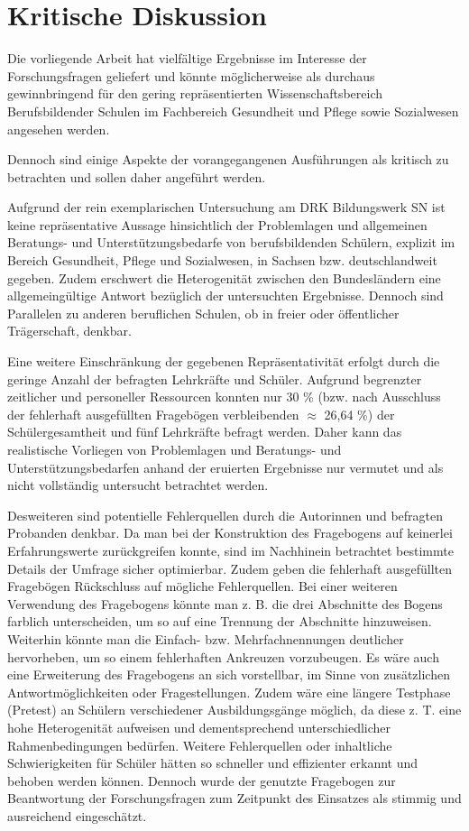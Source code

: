 \section{Kritische Diskussion}
\label{sec:KritischeDiskussion}

Die vorliegende Arbeit hat vielfältige Ergebnisse im Interesse der Forschungsfragen geliefert und könnte möglicherweise als durchaus gewinnbringend für den gering repräsentierten Wissenschaftsbereich Berufsbildender Schulen im Fachbereich Gesundheit und Pflege sowie Sozialwesen angesehen werden.

Dennoch sind einige Aspekte der vorangegangenen Ausführungen als kritisch zu betrachten und sollen daher angeführt werden.

Aufgrund der rein exemplarischen Untersuchung am DRK Bildungswerk SN ist keine repräsentative Aussage hinsichtlich der Problemlagen und allgemeinen Beratungs- und Unterstützungsbedarfe von berufsbildenden Schülern, explizit im Bereich Gesundheit, Pflege und Sozialwesen, in Sachsen bzw. deutschlandweit gegeben. Zudem erschwert die Heterogenität zwischen den Bundesländern eine allgemeingültige Antwort bezüglich der untersuchten Ergebnisse. Dennoch sind Parallelen zu anderen beruflichen Schulen, ob in freier oder öffentlicher Trägerschaft, denkbar.

Eine weitere Einschränkung der gegebenen Repräsentativität erfolgt durch die geringe Anzahl der befragten Lehrkräfte und Schüler. Aufgrund begrenzter zeitlicher und personeller Ressourcen konnten nur 30 \% (bzw. nach Ausschluss der fehlerhaft ausgefüllten Fragebögen verbleibenden $\approx$ 26,64 \%) der Schülergesamtheit und fünf Lehrkräfte befragt werden. Daher kann das realistische Vorliegen von Problemlagen und Beratungs- und Unterstützungsbedarfen anhand der eruierten Ergebnisse nur vermutet und als nicht vollständig untersucht betrachtet werden. 

Desweiteren sind potentielle Fehlerquellen durch die Autorinnen und befragten Probanden denkbar. Da man bei der Konstruktion des Fragebogens auf keinerlei Erfahrungswerte zurückgreifen konnte, sind im Nachhinein betrachtet bestimmte Details der Umfrage sicher optimierbar. Zudem geben die fehlerhaft ausgefüllten Fragebögen Rückschluss auf mögliche Fehlerquellen. Bei einer weiteren Verwendung des Fragebogens könnte man z. B. die drei Abschnitte des Bogens farblich unterscheiden, um so auf eine Trennung der Abschnitte hinzuweisen. Weiterhin könnte man die Einfach- bzw. Mehrfachnennungen deutlicher hervorheben, um so einem fehlerhaften Ankreuzen vorzubeugen. Es wäre auch eine Erweiterung des Fragebogens an sich vorstellbar, im Sinne von zusätzlichen Antwortmöglichkeiten oder Fragestellungen. Zudem wäre eine längere Testphase (Pretest) an Schülern verschiedener Ausbildungsgänge möglich, da diese z. T. eine hohe Heterogenität aufweisen und dementsprechend unterschiedlicher Rahmenbedingungen bedürfen. Weitere Fehlerquellen oder inhaltliche Schwierigkeiten für Schüler hätten so schneller und effizienter erkannt und behoben werden können. Dennoch wurde der genutzte Fragebogen zur Beantwortung der Forschungsfragen zum Zeitpunkt des Einsatzes als stimmig und ausreichend eingeschätzt.

